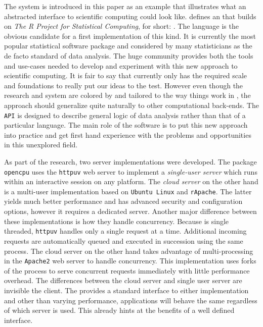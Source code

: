 The \OpenCPU system is introduced in this paper as an example that illustrates what an abstracted interface to scientific computing could look like. \OpenCPU defines an \HTTP \API that builds on \emph{The R Project for Statistical Computing}, for short: \R \citep{R}. The \R language is the obvious candidate for a first implementation of this kind. It is currently the most popular statistical software package and considered by many statisticians as the de facto standard of data analysis. The huge \R community provides both the tools and use-cases needed to develop and experiment with this new approach to scientific computing. It is fair to say that currently only \R has the required scale and foundations to really put our ideas to the test. However even though the research and \OpenCPU system are colored by and tailored to the way things work in \R, the approach should generalize quite naturally to other computational back-ends. The \texttt{API} is designed to describe general logic of data analysis rather than that of a particular language. The main role of the software is to put this new approach into practice and get first hand experience with the problems and opportunities in this unexplored field. 

As part of the research, two \OpenCPU server implementations were developed. The \R package \texttt{opencpu} uses the \texttt{httpuv} web server \citep{httpuv} to implement a \emph{single-user server} which runs within an interactive \R session on any platform. The \emph{cloud server} on the other hand is a multi-user implementation based on \texttt{Ubuntu Linux} and \texttt{rApache}. The latter yields much better performance and has advanced security and configuration options, however it requires a dedicated \Linux server. Another major difference between these implementations is how they handle concurrency. Because \R is single threaded, \texttt{httpuv} handles only a single request at a time. Additional incoming requests are automatically queued and executed in succession using the same process. The cloud server on the other hand takes advantage of multi-processing in the \texttt{Apache2} web server to handle concurrency. This implementation uses forks of the \R process to serve concurrent requests immediately with little performance overhead. The differences between the cloud server and single user server are invisible the client. The \API provides a standard interface to either implementation and other than varying performance, applications will behave the same regardless of which server is used. This already hints at the benefits of a well defined interface.


